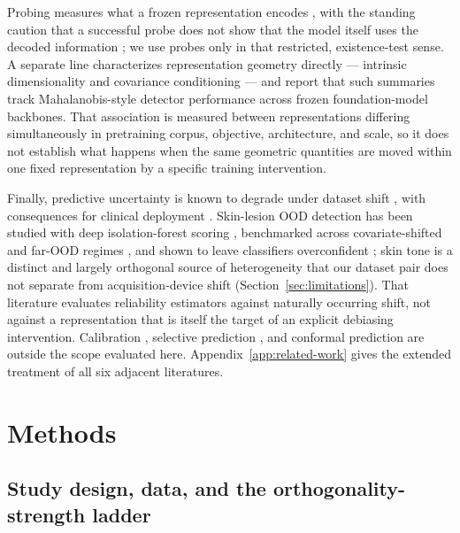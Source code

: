 Probing measures what a frozen representation encodes \citep{alain2016understanding, hewitt2019designing}, with the standing caution that a successful probe does not show that the model itself uses the decoded information \citep{belinkov2022probing}; we use probes only in that restricted, existence-test sense. A separate line characterizes representation geometry directly --- intrinsic dimensionality \citep{levina2004maximum, facco2017estimating, ansuini2019intrinsic} and covariance conditioning --- and \citet{janiak2026geometry} report that such summaries track Mahalanobis-style detector performance across frozen foundation-model backbones. That association is measured between representations differing simultaneously in pretraining corpus, objective, architecture, and scale, so it does not establish what happens when the same geometric quantities are moved within one fixed representation by a specific training intervention.

Finally, predictive uncertainty is known to degrade under dataset shift \citep{ovadia2019can}, with consequences for clinical deployment \citep{finlayson2021clinician}. Skin-lesion OOD detection has been studied with deep isolation-forest scoring \citep{li2020deepif}, benchmarked across covariate-shifted and far-OOD regimes \citep{gutbrod2025openmibood}, and shown to leave classifiers overconfident \citep{pacheco2020outofdistribution}; skin tone is a distinct and largely orthogonal source of heterogeneity \citep{daneshjou2022disparities} that our dataset pair does not separate from acquisition-device shift (Section~\ref{sec:limitations}). That literature evaluates reliability estimators against naturally occurring shift, not against a representation that is itself the target of an explicit debiasing intervention. Calibration \citep{guo2017calibration}, selective prediction \citep{elyaniv2010foundations, geifman2017selective}, and conformal prediction \citep{angelopoulos2023conformal} are outside the scope evaluated here. Appendix~\ref{app:related-work} gives the extended treatment of all six adjacent literatures.

\section{Methods}
\label{sec:methods}

\subsection{Study design, data, and the orthogonality-strength ladder}
\label{sec:design}
\label{sec:datasets}
\label{sec:ladder}

